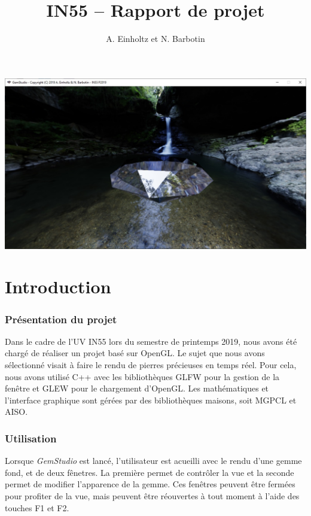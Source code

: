 \documentclass[a4paper,12pt]{article}
\title{IN55 -- Rapport de projet}
\author{A. Einholtz et N. Barbotin}
\begin{document}
\setlength{\parindent}{0cm}
\setlength{\parskip}{8pt}

\begin{center}
    \Huge\thetitle

    \vfill
    \includegraphics[width=15cm]{screenshot.jpg}
    \vfill
\end{center}

\newpage
\tableofcontents

\newpage
\part{Introduction}
\section{Présentation du projet}
Dans le cadre de l'UV IN55 lors du semestre de printemps 2019, nous avons été chargé de réaliser
un projet basé sur OpenGL. Le sujet que nous avons sélectionné visait à faire le rendu de pierres
précieuses en temps réel. Pour cela, nous avons utilisé C++ avec les bibliothèques GLFW pour la
gestion de la fenêtre et GLEW pour le chargement d'OpenGL. Les mathématiques et l'interface graphique
sont gérées par des bibliothèques maisons, soit MGPCL et AISO.

\section{Utilisation}
Lorsque \emph{GemStudio} est lancé, l'utilisateur est acueilli avec le rendu d'une gemme fond, et de
deux fênetres. La première permet de contrôler la vue et la seconde permet de modifier l'apparence de
la gemme. Ces fenêtres peuvent être fermées pour profiter de la vue, mais peuvent être réouvertes à tout
moment à l'aide des touches F1 et F2.
\end{document}
